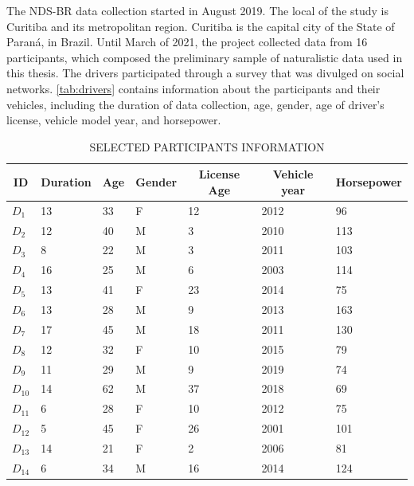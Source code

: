 The NDS-BR data collection started in August 2019. The local of the study is Curitiba and its metropolitan region. Curitiba is the capital city of the State of Paraná, in Brazil. Until March of 2021, the project collected data from 16 participants, which composed the preliminary sample of naturalistic data used in this thesis. The drivers participated through a survey that was divulged on social networks. \autoref{tab:drivers} contains information about the participants and their vehicles, including the duration of data collection, age, gender, age of driver's license, vehicle model year, and horsepower.

\begin{table}[!htbp]
    \footnotesize
    \captionsetup{justification=raggedright,
        singlelinecheck=false,
        font=footnotesize}
    \caption{SELECTED PARTICIPANTS INFORMATION}
    \centering
    \begin{tabular}{lllllll}
        \hline
        \multicolumn{1}{c}{\textbf{ID}} & \multicolumn{1}{c}{\textbf{Duration}} & \multicolumn{1}{c}{\textbf{Age}} & \multicolumn{1}{c}{\textbf{Gender}} & \multicolumn{1}{c}{\textbf{License Age}} & \multicolumn{1}{c}{\textbf{Vehicle year}} & \multicolumn{1}{c}{\textbf{Horsepower}} \\
        \hline
        $D_1$    & 13 & 33 & F & 12 & 2012 & 96  \\ %
        $D_2$    & 12 & 40 & M & 3  & 2010 & 113 \\ %
        $D_3$    & 8  & 22 & M & 3  & 2011 & 103 \\ %
        $D_4$    & 16 & 25 & M & 6  & 2003 & 114 \\ %
        $D_5$    & 13 & 41 & F & 23 & 2014 & 75  \\ %
        $D_6$    & 13 & 28 & M & 9  & 2013 & 163 \\ %
        $D_7$    & 17 & 45 & M & 18 & 2011 & 130 \\ %
        $D_8$    & 12 & 32 & F & 10 & 2015 & 79  \\ %
        $D_9$    & 11 & 29 & M & 9  & 2019 & 74  \\ %
        $D_{10}$ & 14 & 62 & M & 37 & 2018 & 69  \\ %
        $D_{11}$ & 6  & 28 & F & 10 & 2012 & 75  \\ %
        $D_{12}$ & 5  & 45 & F & 26 & 2001 & 101 \\ %
        $D_{13}$ & 14 & 21 & F & 2  & 2006 & 81  \\ %
        $D_{14}$ & 6  & 34 & M & 16 & 2014 & 124 \\ %

\end{tabular}
\end{table}
